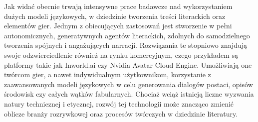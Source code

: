 Jak widać obecnie trwają intensywne prace badawcze nad wykorzystaniem dużych modeli językowych, 
w dziedzinie tworzenia treści literackich oraz elementów gier. Jednym z 
obiecujących zastosowań jest stworzenie w pełni autonomicznych, generatywnych agentów literackich, 
zdolnych do samodzielnego tworzenia spójnych i angażujących narracji. Rozwiązania te stopniowo 
znajdują swoje odzwierciedlenie również na rynku komercyjnym, czego przykładem są platformy takie 
jak Inworld.ai czy Nvidia Avatar Cloud Engine. Umożliwiają one twórcom gier, a nawet indywidualnym 
użytkownikom, korzystanie z zaawansowanych modeli językowych w celu generowania dialogów postaci, 
opisów środowisk czy całych wątków fabularnych. Chociaż wciąż istnieją liczne wyzwania natury 
technicznej i etycznej, rozwój tej technologii może znacząco zmienić oblicze branży rozrywkowej 
oraz procesów twórczych w dziedzinie literatury.